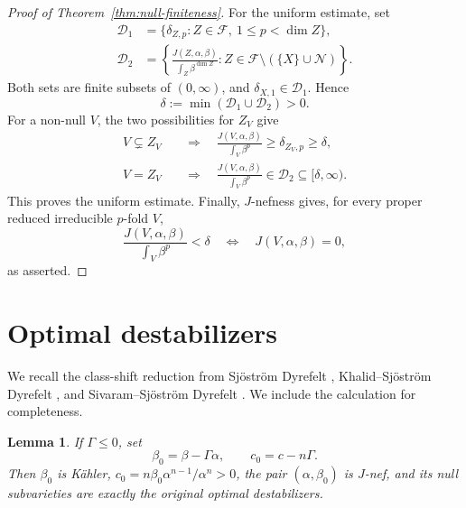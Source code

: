 \documentclass[reqno]{amsart}
\theoremstyle{remark}
\theoremstyle{plain}
\newtheorem{lemma}[thm]{Lemma}
\begin{document}
\begin{proof}[Proof of Theorem~\ref{thm:null-finiteness}]
For the uniform estimate, set
\[
\begin{aligned}
\mathcal D_1
&=\{\delta_{Z,p}:Z\in\mathcal F,\ 1\le p<\dim Z\},\\
\mathcal D_2
&=\left\{\frac{J(Z,\alpha,\beta)}{\int_Z\beta^{\dim Z}}:
 Z\in\mathcal F\setminus(\{X\}\cup\mathcal N)\right\}.
\end{aligned}
\]
Both sets are finite subsets of \((0,\infty)\), and
\(\delta_{X,1}\in\mathcal D_1\). Hence
\[
\delta:=\min(\mathcal D_1\cup\mathcal D_2)>0.
\]
For a non-null \(V\), the two possibilities for \(Z_V\) give
\[
\begin{aligned}
V\subsetneq Z_V
&\quad\Longrightarrow\quad
\frac{J(V,\alpha,\beta)}{\int_V\beta^p}\ge\delta_{Z_V,p}\ge\delta,\\
V=Z_V
&\quad\Longrightarrow\quad
\frac{J(V,\alpha,\beta)}{\int_V\beta^p}\in\mathcal D_2\subseteq[\delta,\infty).
\end{aligned}
\]
This proves the uniform estimate. Finally,  \(J\)-nefness gives,
for every proper reduced irreducible \(p\)-fold \(V\),
\[
\frac{J(V,\alpha,\beta)}{\int_V\beta^p}<\delta
\quad\Longleftrightarrow\quad J(V,\alpha,\beta)=0,
\]
as asserted.









\end{proof}

\section{Optimal destabilizers}
We recall the class-shift reduction from Sj\"ostr\"om Dyrefelt \cite[Lemma 14]{SD20}, Khalid--Sj\"ostr\"om Dyrefelt \cite[proof of Theorem 3.10 and Remark 3.11]{KSD26}, and Sivaram--Sj\"ostr\"om Dyrefelt \cite[Section 2.2.1]{SSD26}. We include the calculation for completeness.
\begin{samepage}
\begin{lemma}\label{lem:shift} If \(\Gamma\le0\), set
\[
\beta_0=\beta-\Gamma\alpha,\qquad c_0=c-n\Gamma.
\]
Then \(\beta_0\) is K\"ahler, \(c_0=n\beta_0\alpha^{n-1}/\alpha^n>0\), the pair \((\alpha,\beta_0)\) is  \(J\)-nef, and its null subvarieties are exactly the original optimal destabilizers.
\end{lemma}
\end{samepage}
\end{document}

